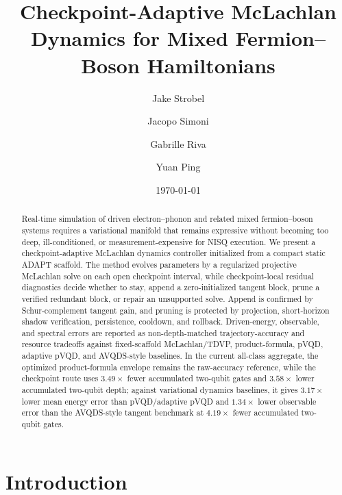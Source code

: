 \documentclass[
  reprint,
  amsmath,
  amssymb,
  aps,
  pra,
  nofootinbib,
  superscriptaddress,
  floatfix
]{revtex4-2}
\newcommand{\tentative}[1]{\textcolor{red!70!black}{#1}}
\begin{document}
\title{Checkpoint-Adaptive McLachlan Dynamics for Mixed Fermion--Boson Hamiltonians}

\author{Jake Strobel}
\author{Jacopo Simoni}
\author{Gabrille Riva}
\author{Yuan Ping}

\date{\today}


\begin{abstract}
Real-time simulation of driven electron--phonon and related mixed fermion--boson systems requires a variational manifold that remains expressive without becoming too deep, ill-conditioned, or measurement-expensive for NISQ execution.  We present a checkpoint-adaptive McLachlan dynamics controller initialized from a compact static ADAPT scaffold.  The method evolves parameters by a regularized projective McLachlan solve on each open checkpoint interval, while checkpoint-local residual diagnostics decide whether to stay, append a zero-initialized tangent block, prune a verified redundant block, or repair an unsupported solve.  Append is confirmed by Schur-complement tangent gain, and pruning is protected by projection, short-horizon shadow verification, persistence, cooldown, and rollback.  Driven-energy, observable, and spectral errors are reported as non-depth-matched trajectory-accuracy and resource tradeoffs against fixed-scaffold McLachlan/TDVP, product-formula, pVQD, adaptive pVQD, and AVQDS-style baselines.  In the current all-class aggregate, the optimized product-formula envelope remains the raw-accuracy reference, while the checkpoint route uses \tentative{$3.49\times$} fewer accumulated two-qubit gates and \tentative{$3.58\times$} lower accumulated two-qubit depth; against variational dynamics baselines, it gives \tentative{$3.17\times$} lower mean energy error than pVQD/adaptive pVQD and \tentative{$1.34\times$} lower observable error than the AVQDS-style tangent benchmark at \tentative{$4.19\times$} fewer accumulated two-qubit gates.
\end{abstract}

\maketitle


\section{Introduction}
\end{document}
